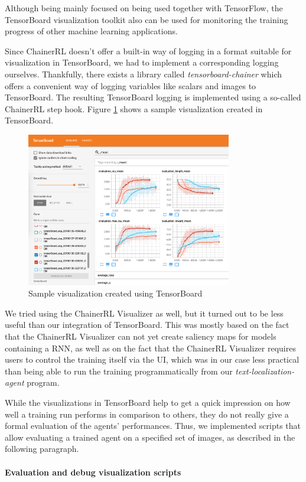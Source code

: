 Although being mainly focused on being used together with TensorFlow, the TensorBoard visualization toolkit\cite{TensorBoard} also can be used for monitoring the training progress of other machine learning applications.

Since ChainerRL doesn't offer a built-in way of logging in a format suitable for visualization in TensorBoard, we had to implement a corresponding logging ourselves.
Thankfully, there exists a library called \textit{tensorboard-chainer}\cite{TensorBoardChainer} which offers a convenient way of logging variables like scalars and images to TensorBoard.
The resulting TensorBoard logging is implemented using a so-called ChainerRL step hook\cite{ChainerRLStepHooks}.
Figure \ref{fig:tensorboard-sample-output} shows a sample visualization created in TensorBoard.

\begin{figure}[h!]
    \centering
    \includegraphics[width=0.8\textwidth]{figures/tensorboard-sample-output.png}
    \caption{Sample visualization created using TensorBoard}
    \label{fig:tensorboard-sample-output}
\end{figure}

\noindent We tried using the ChainerRL Visualizer\cite{ChainerRLVisualizer} as well, but it turned out to be less useful than our integration of TensorBoard.
This was mostly based on the fact that the ChainerRL Visualizer can not yet create saliency maps for models containing a RNN, as well as on the fact that the ChainerRL Visualizer requires users to control the training itself via the UI, which was in our case less practical than being able to run the training programmatically from our \textit{text-localization-agent} program.

While the visualizations in TensorBoard help to get a quick impression on how well a training run performs in comparison to others, they do not really give a formal evaluation of the agents' performances.
Thus, we implemented scripts that allow evaluating a trained agent on a specified set of images, as described in the following paragraph.

\paragraph{Evaluation and debug visualization scripts}

